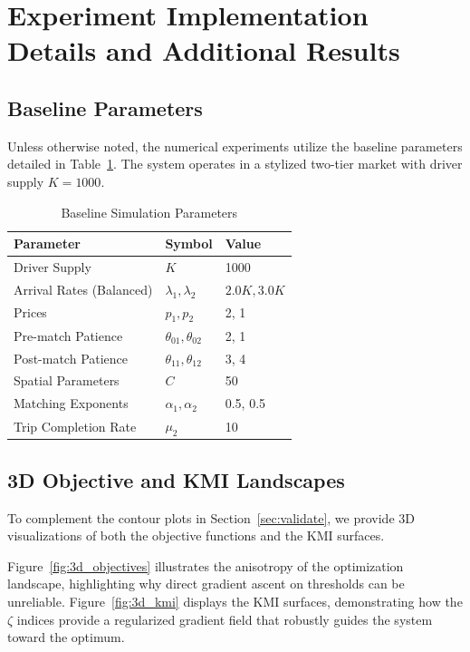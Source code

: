 \section{Experiment Implementation Details and Additional Results}
\label{app:experiment_details}

\subsection{Baseline Parameters}
Unless otherwise noted, the numerical experiments utilize the baseline parameters detailed in Table~\ref{tab:baseline_params}. The system operates in a stylized two-tier market with driver supply $K=1000$.

\begin{table}[htbp]
\centering
\caption{Baseline Simulation Parameters}
\label{tab:baseline_params}
\small
\begin{tabular}{lll}
\toprule
Parameter & Symbol & Value \\
\midrule
Driver Supply & $K$ & 1000 \\
Arrival Rates (Balanced) & $\lambda_1, \lambda_2$ & $2.0K, 3.0K$ \\
Prices & $p_1, p_2$ & 2, 1 \\
Pre-match Patience & $\theta_{01}, \theta_{02}$ & 2, 1 \\
Post-match Patience & $\theta_{11}, \theta_{12}$ & 3, 4 \\
Spatial Parameters & $C$ & 50 \\
Matching Exponents & $\alpha_1, \alpha_2$ & 0.5, 0.5 \\
Trip Completion Rate & $\mu_2$ & 10 \\
\bottomrule
\end{tabular}
\end{table}

\subsection{3D Objective and KMI Landscapes}
\label{app:3d_landscapes}
To complement the contour plots in Section~\ref{sec:validate}, we provide 3D visualizations of both the objective functions and the KMI surfaces.

Figure~\ref{fig:3d_objectives} illustrates the anisotropy of the optimization landscape, highlighting why direct gradient ascent on thresholds can be unreliable.
Figure~\ref{fig:3d_kmi} displays the KMI surfaces, demonstrating how the $\zeta$ indices provide a regularized gradient field that robustly guides the system toward the optimum.

